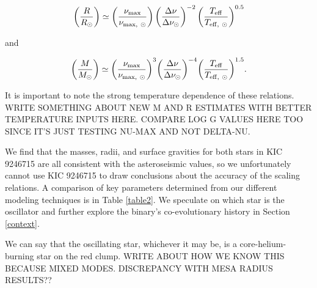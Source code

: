 \begin{equation} \label{radeq}
\left( \frac{R}{R_\odot} \right) \simeq \left( \frac{\nu_{\rm{max}}}{\nu_{\rm{max, \ \odot}}} \right) \left( \frac{\Delta \nu}{\Delta \nu_\odot} \right)^{-2} {\left( \frac{T_{\rm{eff}}}{T_{\rm{eff, \ \odot}}} \right)}^{0.5}
\end{equation}

and

\begin{equation} \label{masseq}
{\left( \frac{M}{M_\odot} \right)} \simeq {\left( \frac{\nu_{\rm{max}}}{\nu_{\rm{max, \ \odot}}} \right)}^{3} {\left( \frac{\Delta \nu}{\Delta \nu_\odot} \right)}^{-4} {\left( \frac {T_{\rm{eff}}} {T_{\rm{eff, \ \odot}}} \right)}^{1.5}.
\end{equation}

It is important to note the strong temperature dependence of these relations. WRITE SOMETHING ABOUT NEW M AND R ESTIMATES WITH BETTER TEMPERATURE INPUTS HERE. COMPARE LOG G VALUES HERE TOO SINCE IT'S JUST TESTING NU-MAX AND NOT DELTA-NU.

We find that the masses, radii, and surface gravities for both stars in KIC 9246715 are all consistent with the asteroseismic values, so we unfortunately cannot use KIC 9246715 to draw conclusions about the accuracy of the scaling relations. A comparison of key parameters determined from our different modeling techniques is in Table \ref{table2}. We speculate on which star is the oscillator and further explore the binary's co-evolutionary history in Section \ref{context}.

We can say that the oscillating star, whichever it may be, is a core-helium-burning star on the red clump. WRITE ABOUT HOW WE KNOW THIS BECAUSE MIXED MODES. DISCREPANCY WITH MESA RADIUS RESULTS??

  